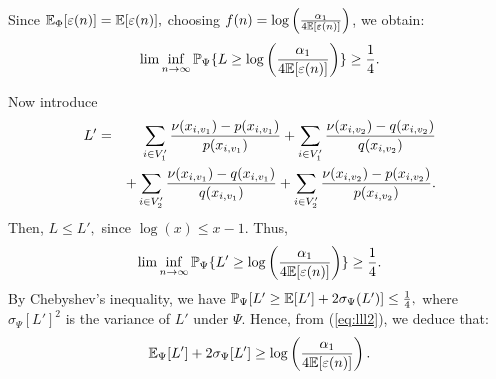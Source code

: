 Since  ${\mathbb E}_{\Phi}[\varepsilon(n) ] ={\mathbb E} [\varepsilon(n) ],$ choosing $f(n) = \log
\left( \frac{\alpha_1}{4 {\mathbb E} [ \varepsilon(n) ]} \right)$, we obtain:\begin{equation}\label{eq:infimum}
 \lim\inf_{n \rightarrow \infty}\mathbb{P}_{\Psi} \{ L \ge  \log \left( \frac{\alpha_1}{4 {\mathbb E} [ \varepsilon(n) ]} \right) \} \ge \frac{1}{4}. 
\end{equation}

Now introduce
\begin{eqnarray*}L' & = &\sum_{i\in V_1'}
  \frac{\nu(x_{i, v_1 }) -
    p(x_{i,v_1})}{p(x_{i,v_1})}
  +\sum_{i\in V_1'}\frac{\nu(x_{i,v_2})-q(x_{i,v_2})}{q(x_{i,v_2})}
  \cr & &+ \sum_{i \in V_2'}
  \frac{\nu(x_{i, v_1})-q(x_{i,v_1})}{q(x_{i,v_1})}+\sum_{i\in V_2'}  \frac{\nu(x_{i,v_2})-p(x_{i,v_2})}{p(x_{i,v_2})}.\end{eqnarray*}
Then, $L \le L',$ since $\log (x) \le x-1.$ Thus,
\begin{equation}\label{eq:lll2}
 \lim\inf_{n \rightarrow \infty}\mathbb{P}_{\Psi} \{ L' \ge  \log \left( \frac{\alpha_1}{4 {\mathbb E} [ \varepsilon(n) ]} \right) \} \ge \frac{1}{4}. 
\end{equation}
By Chebyshev's inequality, we have 
$
\mathbb{P}_{\Psi}[L'\ge \mathbb{E}[L'] + 2\sigma_{\Psi}(L')]\le {1\over 4},
$
where $\sigma_{\Psi}[L']^2$ is the variance of $L'$ under $\Psi$. Hence, from (\ref{eq:lll2}), we deduce that: 
\begin{equation}{\mathbb E}_{\Psi}[L'] + 2\sigma_{\Psi}[L'] \ge \log \left(
\frac{\alpha_1}{4 {\mathbb E} [ \varepsilon(n) ]} \right).
\label{eq:chevy-1}
\end{equation}
 
